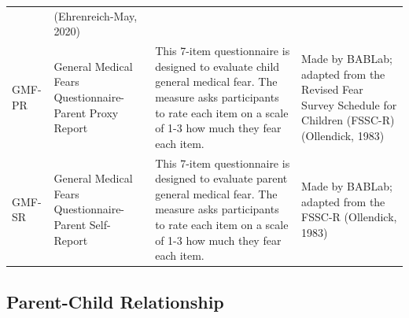 \documentclass[]{book}
\begin{document}
\begin{longtable}[]{@{}llll@{}}
\begin{minipage}[t]{0.38\columnwidth}
\end{minipage} & \begin{minipage}[t]{0.15\columnwidth}\raggedright
(Ehrenreich-May, 2020)\strut
\end{minipage}\tabularnewline
\begin{minipage}[t]{0.13\columnwidth}\raggedright
GMF-PR\strut
\end{minipage} & \begin{minipage}[t]{0.21\columnwidth}\raggedright
General Medical Fears Questionnaire- Parent Proxy Report\strut
\end{minipage} & \begin{minipage}[t]{0.38\columnwidth}\raggedright
This 7-item questionnaire is designed to evaluate child general medical fear. The measure asks participants to rate each item on a scale of 1-3 how much they fear each item.\strut
\end{minipage} & \begin{minipage}[t]{0.15\columnwidth}\raggedright
Made by BABLab; adapted from the Revised Fear Survey Schedule for Children (FSSC-R) (Ollendick, 1983)\strut
\end{minipage}\tabularnewline
\begin{minipage}[t]{0.13\columnwidth}\raggedright
GMF-SR\strut
\end{minipage} & \begin{minipage}[t]{0.21\columnwidth}\raggedright
General Medical Fears Questionnaire- Parent Self-Report\strut
\end{minipage} & \begin{minipage}[t]{0.38\columnwidth}\raggedright
This 7-item questionnaire is designed to evaluate parent general medical fear. The measure asks participants to rate each item on a scale of 1-3 how much they fear each item.\strut
\end{minipage} & \begin{minipage}[t]{0.15\columnwidth}\raggedright
Made by BABLab; adapted from the FSSC-R (Ollendick, 1983)\strut
\end{minipage}\tabularnewline
\bottomrule
\end{longtable}

\hypertarget{parent-child-relationship}{%
\subsection{Parent-Child Relationship}\label{parent-child-relationship}}
\end{document}
